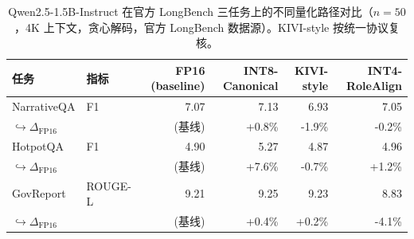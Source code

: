 \begin{table}[!htbp]
\centering
\caption{Qwen2.5-1.5B-Instruct 在官方 LongBench 三任务上的不同量化路径对比（$n=50$，4K 上下文，贪心解码，官方 LongBench 数据源）。KIVI-style 按统一协议复核。}
\label{tab:official-longbench-1p5b}
\begin{tabular}{llrrrr}
\toprule
任务 & 指标 & FP16 (baseline) & INT8-Canonical & KIVI-style & INT4-RoleAlign \\
\midrule
NarrativeQA & F1 & 7.07 & 7.13 & 6.93 & 7.05 \\
$\hookrightarrow \Delta_{\text{FP16}}$ &  & (基线) & +0.8\% & -1.9\% & -0.2\% \\
HotpotQA & F1 & 4.90 & 5.27 & 4.87 & 4.96 \\
$\hookrightarrow \Delta_{\text{FP16}}$ &  & (基线) & +7.6\% & -0.7\% & +1.2\% \\
GovReport & ROUGE-L & 9.21 & 9.25 & 9.23 & 8.83 \\
$\hookrightarrow \Delta_{\text{FP16}}$ &  & (基线) & +0.4\% & +0.2\% & -4.1\% \\
\bottomrule
\end{tabular}
\end{table}
